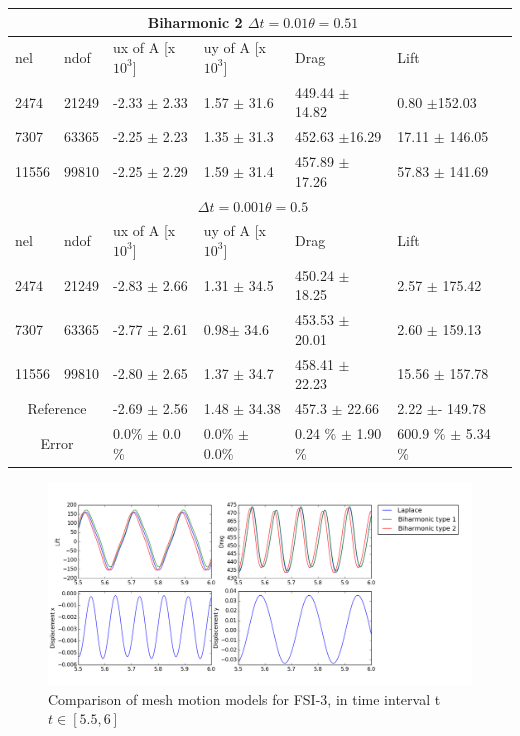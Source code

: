 \begin{table}[h!]
\centering
\label{my-label}
\begin{tabular}{ |p{1cm}||p{1cm}|p{2.7cm}|p{2.7cm}|p{2.9cm}|p{3.1cm}|p{1.2cm}|}
 \hline
  \multicolumn{6}{|c|}{Biharmonic 2 \hspace{2mm}  $\Delta t = 0.01 \theta = 0.51$} \\
   \hline
nel & ndof & ux of A [x $10^{3}$]  &uy of A [x $10^{3}$]& Drag  & Lift \\
 \hline
 2474    & 21249  &-2.33 $\pm$ 2.33 & 1.57 $\pm$ 31.6    & 449.44  $\pm$ 14.82 & 0.80  $\pm$152.03  \\
 7307    & 63365  & -2.25 $\pm$ 2.23 &  1.35 $\pm$ 31.3  & 452.63     $\pm$16.29 & 17.11     $\pm$  146.05 \\
 11556   & 99810  & -2.25  $\pm$ 2.29 & 1.59  $\pm$ 31.4 & 457.89   $\pm$ 17.26 & 57.83      $\pm$  141.69 \\
 \hline
  \multicolumn{6}{|c|}{$\Delta t = 0.001 \theta = 0.5$} \\
   \hline
 nel & ndof & ux of A [x $10^{3}$]  &uy of A [x $10^{3}$]& Drag  & Lift \\
 2474    & 21249  & -2.83 $\pm$ 2.66   & 1.31 $\pm$ 34.5  &  450.24    $\pm$  18.25 & 2.57  $\pm$   175.42  \\
 7307    & 63365  & -2.77 $\pm$ 2.61    & 0.98$\pm$  34.6 & 453.53    $\pm$ 20.01 & 2.60   $\pm$ 159.13  \\
 11556   & 99810  & -2.80  $\pm$ 2.65 & 1.37 $\pm$ 34.7 & 458.41  $\pm$ 22.23 & 15.56   $\pm$  157.78 \\
 \hline
 \multicolumn{2}{|c|}{Reference} & -2.69 $\pm$  2.56                    & 1.48  $\pm$  34.38                   & 457.3  $\pm$  22.66        & 2.22  $\pm$- 149.78           \\
 \hline
 \multicolumn{2}{|c|}{Error}  &0.0\% $\pm$ 0.0 \% & 0.0\% $\pm$ 0.0\% & 0.24 \% $\pm$ 1.90 \% & 600.9 \% $\pm$ 5.34 \% \\
 \hline
\end{tabular}
\end{table}

\newpage

\begin{figure}[h!]
    \includegraphics[scale=0.5]{./Fig/fsi3compare.png}
      \caption{Comparison of mesh motion models for FSI-3, in time interval t $t \in [5.5, 6]$}
\end{figure}

